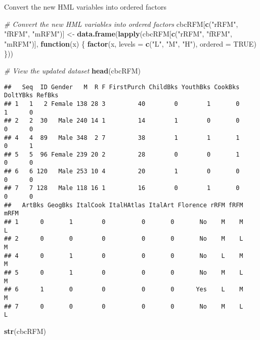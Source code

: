\documentclass[
]{article}
\newenvironment{Shaded}{\begin{snugshade}}{\end{snugshade}}
\newcommand{\AttributeTok}[1]{\textcolor[rgb]{0.13,0.29,0.53}{#1}}
\newcommand{\CommentTok}[1]{\textcolor[rgb]{0.56,0.35,0.01}{\textit{#1}}}
\newcommand{\ConstantTok}[1]{\textcolor[rgb]{0.56,0.35,0.01}{#1}}
\newcommand{\ControlFlowTok}[1]{\textcolor[rgb]{0.13,0.29,0.53}{\textbf{#1}}}
\newcommand{\FunctionTok}[1]{\textcolor[rgb]{0.13,0.29,0.53}{\textbf{#1}}}
\newcommand{\NormalTok}[1]{#1}
\newcommand{\OtherTok}[1]{\textcolor[rgb]{0.56,0.35,0.01}{#1}}
\newcommand{\StringTok}[1]{\textcolor[rgb]{0.31,0.60,0.02}{#1}}
\begin{document}
Convert the new HML variables into ordered factors

\begin{Shaded}
\begin{Highlighting}[]
\CommentTok{\# Convert the new HML variables into ordered factors}
\NormalTok{cbcRFM[}\FunctionTok{c}\NormalTok{(}\StringTok{"rRFM"}\NormalTok{, }\StringTok{"fRFM"}\NormalTok{, }\StringTok{"mRFM"}\NormalTok{)] }\OtherTok{\textless{}{-}} \FunctionTok{data.frame}\NormalTok{(}\FunctionTok{lapply}\NormalTok{(cbcRFM[}\FunctionTok{c}\NormalTok{(}\StringTok{"rRFM"}\NormalTok{, }\StringTok{"fRFM"}\NormalTok{, }\StringTok{"mRFM"}\NormalTok{)], }
  \ControlFlowTok{function}\NormalTok{(x) \{}
    \FunctionTok{factor}\NormalTok{(x, }\AttributeTok{levels =} \FunctionTok{c}\NormalTok{(}\StringTok{"L"}\NormalTok{, }\StringTok{"M"}\NormalTok{, }\StringTok{"H"}\NormalTok{), }\AttributeTok{ordered =} \ConstantTok{TRUE}\NormalTok{)}
\NormalTok{  \}))}

\CommentTok{\# View the updated dataset}
\FunctionTok{head}\NormalTok{(cbcRFM)}
\end{Highlighting}
\end{Shaded}

\begin{verbatim}
##   Seq  ID Gender   M  R F FirstPurch ChildBks YouthBks CookBks DoltYBks RefBks
## 1   1   2 Female 138 28 3         40        0        1       0        1      0
## 2   2  30   Male 240 14 1         14        1        0       0        0      0
## 4   4  89   Male 348  2 7         38        1        1       1        0      1
## 5   5  96 Female 239 20 2         28        0        0       1        0      0
## 6   6 120   Male 253 10 4         20        1        0       0        0      0
## 7   7 128   Male 118 16 1         16        0        1       0        0      0
##   ArtBks GeogBks ItalCook ItalHAtlas ItalArt Florence rRFM fRFM mRFM
## 1      0       1        0          0       0       No    M    M    L
## 2      0       0        0          0       0       No    M    L    M
## 4      0       1        0          0       0       No    L    M    M
## 5      0       1        0          0       0       No    M    L    M
## 6      1       0        0          0       0      Yes    L    M    M
## 7      0       0        0          0       0       No    M    L    L
\end{verbatim}

\begin{Shaded}
\begin{Highlighting}[]
\FunctionTok{str}\NormalTok{(cbcRFM)}
\end{Highlighting}
\end{Shaded}
\end{document}
